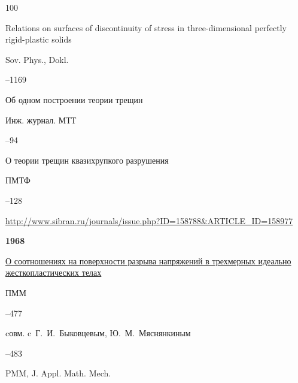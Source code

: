 \begin{thebibliography}{100}

\paper Relations on surfaces of discontinuity of stress in three-dimensional perfectly rigid-plastic solids

\jour Sov. Phys., Dokl. 


--1169 







\paper Об одном построении теории трещин 

\jour Инж. журнал. МТТ



–94




\paper О теории трещин квазихрупкого разрушения 

\jour ПМТФ



–128

\elink \url{http://www.sibran.ru/journals/issue.php?ID=158788&ARTICLE_ID=158977}





\item[] \centerline{\bf 1968}






\paper \href{https://zbmath.org/?q=an:0187.48202}{О соотношениях на поверхности разрыва напряжений в трехмерных идеально жесткопластических телах}

\jour ПММ




–477 

\miscnote cовм. c~Г.~И.~Быковцевым, Ю.~М.~Мяснянкиным


\transl



--483

\jour PMM, J. Appl. Math. Mech. 


\end{thebibliography}
